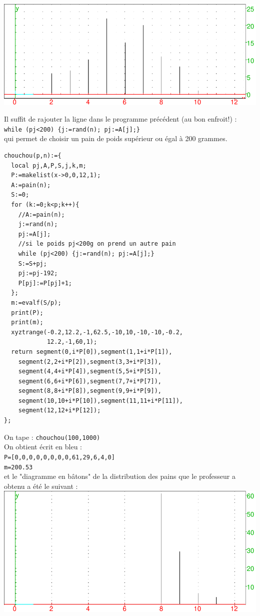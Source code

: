 \documentclass[a4paper,11pt]{book}
\begin{document}
\includegraphics[width=\textwidth]{pain1}

Il suffit de rajouter la ligne dans le programme pr\'ec\'edent 
(au bon enfroit!) :\\
{\tt while (pj<200) \{j:=rand(n); pj:=A[j];\}}\\
qui permet de choisir un pain de poids sup\'erieur ou \'egal \`a 200 grammes.
\begin{verbatim}
chouchou(p,n):={
  local pj,A,P,S,j,k,m;
  P:=makelist(x->0,0,12,1);
  A:=pain(n);
  S:=0;
  for (k:=0;k<p;k++){
    //A:=pain(n);
    j:=rand(n);	
    pj:=A[j];
    //si le poids pj<200g on prend un autre pain
    while (pj<200) {j:=rand(n); pj:=A[j];}
    S:=S+pj;
    pj:=pj-192;
    P[pj]:=P[pj]+1;
  };
  m:=evalf(S/p);
  print(P);
  print(m);
  xyztrange(-0.2,12.2,-1,62.5,-10,10,-10,-10,-0.2,
            12.2,-1,60,1);
  return segment(0,i*P[0]),segment(1,1+i*P[1]),
    segment(2,2+i*P[2]),segment(3,3+i*P[3]),
    segment(4,4+i*P[4]),segment(5,5+i*P[5]),
    segment(6,6+i*P[6]),segment(7,7+i*P[7]),
    segment(8,8+i*P[8]),segment(9,9+i*P[9]),
    segment(10,10+i*P[10]),segment(11,11+i*P[11]),
    segment(12,12+i*P[12]);
};   
\end{verbatim}
On tape : {\tt chouchou(100,1000)} \\ 
On obtient \'ecrit en bleu :\\
{\tt P=[0,0,0,0,0,0,0,0,61,29,6,4,0]}\\
{\tt m=200.53}\\
et le "diagramme en b\^atons" de la distribution des pains 
que le professeur a obtenu  a \'et\'e le suivant :\\

\includegraphics[width=\textwidth]{pain2}
\end{document}
